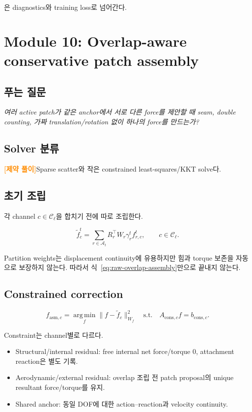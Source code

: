 \documentclass[11pt,a4paper]{article}
\newcommand{\argmin}{\operatorname*{arg\,min}}
\newcommand{\constrained}{\textcolor{darkorange}{\textbf{[제약 풀이]}}}
\begin{document}
은 diagnostics와 training loss로 넘어간다.

\section{Module 10: Overlap-aware conservative patch assembly}

\subsection*{푸는 질문}

\emph{여러 active patch가 같은 anchor에서 서로 다른 force를 제안할 때
seam, double counting, 가짜 translation/rotation 없이 하나의 force를 만드는가?}

\subsection*{Solver 분류}

\constrained Sparse scatter와 작은 constrained least-squares/KKT solve다.

\subsection*{초기 조립}

각 channel \(c\in\mathcal C_\ell\)을 합치기 전에 따로 조립한다.

\begin{equation}
  \widetilde f_c^t
  =
  \sum_{r\in\mathcal A_t}
  R_r^\top W_r
  \gamma_r^t
  f_{r,c}^t,
  \qquad c\in\mathcal C_\ell.
  \label{eq:raw-overlap-assembly}
\end{equation}

Partition weights는 displacement continuity에 유용하지만
힘과 torque 보존을 자동으로 보장하지 않는다.
따라서 식~\eqref{eq:raw-overlap-assembly}만으로 끝내지 않는다.

\subsection*{Constrained correction}

\begin{equation}
  f_{\mathrm{asm},c}
  =
  \argmin_f
  \|f-\widetilde f_c\|_{W_f}^2
  \quad
  \text{s.t.}\quad
  A_{\mathrm{cons},c}f=b_{\mathrm{cons},c}.
  \label{eq:conservative-assembly}
\end{equation}

Constraint는 channel별로 다르다.

\begin{itemize}[leftmargin=1.5em]
  \item Structural/internal residual:
  free internal net force/torque 0, attachment reaction은 별도 기록.
  \item Aerodynamic/external residual:
  overlap 조립 전 patch proposal의 unique resultant force/torque를 유지.
  \item Shared anchor:
  동일 DOF에 대한 action--reaction과 velocity continuity.
\end{itemize}
\end{document}
